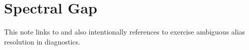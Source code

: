 
\section{Spectral Gap}

This note links to  and also
intentionally references  to exercise ambiguous alias
resolution in diagnostics.
